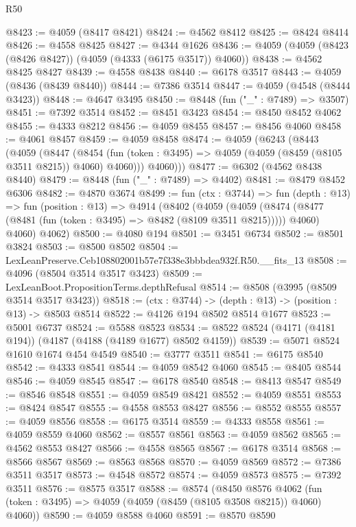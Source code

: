 \begin{lexlean}{R50}
\begin{coremodule}
@8423 := @4059 (@8417 @8421)
@8424 := @4562 @8412
@8425 := @8424 @8414
@8426 := @4558 @8425
@8427 := @4344 @1626
@8436 := @4059 (@4059 (@8423 (@8426 @8427)) (@4059 (@4333 (@6175 @3517)) @4060))
@8438 := @4562 @8425 @8427
@8439 := @4558 @8438
@8440 := @6178 @3517
@8443 := @4059 (@8436 (@8439 @8440))
@8444 := @7386 @3514
@8447 := @4059 (@4548 (@8444 @3423))
@8448 := @4647 @3495
@8450 := @8448 (fun ("_" : @7489) => @3507)
@8451 := @7392 @3514
@8452 := @8451 @3423
@8454 := @8450 @8452 @4062
@8455 := @4333 @8212
@8456 := @4059 @8455
@8457 := @8456 @4060
@8458 := @4061 @8457
@8459 := @4059 @8458
@8474 := @4059
    (@6243
      (@8443
        (@4059
          (@8447
            (@8454 (fun (token : @3495) => @4059 (@4059 (@8459 (@8105 @3511 @8215)) @4060) @4060)))
          @4060)))
@8477 := @6302 (@4562 @8438 @8440)
@8479 := @8448 (fun ("_" : @7489) => @4402)
@8481 := @8479 @8452 @6306
@8482 := @4870 @3674
@8499 := fun (ctx : @3744) =>
  fun (depth : @13) =>
  fun (position : @13) =>
  @4914
    (@8402
      (@4059
        (@4059 (@8474 (@8477 (@8481 (fun (token : @3495) => @8482 (@8109 @3511 @8215))))) @4060)
        @4060)
      @4062)
@8500 := @4080 @194
@8501 := @3451 @6734
@8502 := @8501 @3824
@8503 := @8500 @8502
@8504 := LexLeanPreserve.Ceb108802001b57e7f338e3bbbdea932f.R50.__fits_13
@8508 := @4096 (@8504 @3514 @3517 @3423)
@8509 := LexLeanBoot.PropositionTerms.depthRefusal
@8514 := @8508 (@3995 (@8509 @3514 @3517 @3423))
@8518 := (ctx : @3744) -> (depth : @13) -> (position : @13) -> @8503 @8514
@8522 := @4126 @194 @8502 @8514 @1677
@8523 := @5001 @6737
@8524 := @5588 @8523
@8534 := @8522 @8524 (@4171 (@4181 @194)) (@4187 (@4188 (@4189 @1677) @8502 @4159))
@8539 := @5071 @8524 @1610 @1674 @454 @4549
@8540 := @3777 @3511
@8541 := @6175 @8540
@8542 := @4333 @8541
@8544 := @4059 @8542 @4060
@8545 := @8405 @8544
@8546 := @4059 @8545
@8547 := @6178 @8540
@8548 := @8413 @8547
@8549 := @8546 @8548
@8551 := @4059 @8549 @8421
@8552 := @4059 @8551
@8553 := @8424 @8547
@8555 := @4558 @8553 @8427
@8556 := @8552 @8555
@8557 := @4059 @8556
@8558 := @6175 @3514
@8559 := @4333 @8558
@8561 := @4059 @8559 @4060
@8562 := @8557 @8561
@8563 := @4059 @8562
@8565 := @4562 @8553 @8427
@8566 := @4558 @8565
@8567 := @6178 @3514
@8568 := @8566 @8567
@8569 := @8563 @8568
@8570 := @4059 @8569
@8572 := @7386 @3511 @3517
@8573 := @4548 @8572
@8574 := @4059 @8573
@8575 := @7392 @3511
@8576 := @8575 @3517
@8588 := @8574
    (@8450
      @8576
      @4062
      (fun (token : @3495) => @4059 (@4059 (@8459 (@8105 @3508 @8215)) @4060) @4060))
@8590 := @4059 @8588 @4060
@8591 := @8570 @8590

\end{coremodule}
\end{lexlean}
